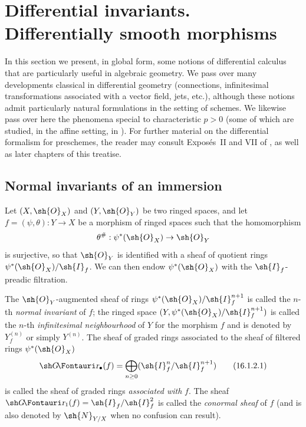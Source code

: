 \section{Differential invariants. Differentially smooth morphisms}
\label{section:IV.16}

In this section we present, in global form, some notions of differential calculus that are particularly useful in algebraic geometry.
We pass over many developments classical in differential geometry (connections, infinitesimal transformations associated with a vector field, jets, etc.), although these notions admit particularly natural formulations in the setting of schemes.
We likewise pass over here the phenomena special to characteristic $p>0$ (some of which are studied, in the affine setting, in ).
For further material on the differential formalism for preschemes, the reader may consult Expos\'es~II and VII of \cite{IV-42}, as well as later chapters of this treatise.

\subsection{Normal invariants of an immersion}
\label{IV.16.1}

\begin{env}[16.1.1]
\label{IV.16.1.1}
Let $(X, \sh{O}_X)$ and $(Y, \sh{O}_Y)$ be two ringed spaces, and let $f = (\psi, \theta): Y \to X$ be a morphism of ringed spaces  such that the homomorphism
\[
  \theta^\#: \psi^*(\sh{O}_X) \to \sh{O}_Y
\]
is surjective, so that $\sh{O}_Y$ is identified with a sheaf of quotient rings $\psi^*(\sh{O}_X)/\sh{I}_f$. 
We can then endow $\psi^*(\sh{O}_X)$ with the $\sh{I}_f$-preadic filtration.
\end{env}

\begin{definition}[16.1.2]
\label{IV.16.1.2}
The $\sh{O}_Y$-augmented sheaf of rings $\psi^*(\sh{O}_X)/\sh{I}_f^{n+1}$ is called the $n$-th \emph{normal invariant} of $f$;
the ringed space $(Y, \psi^*(\sh{O}_X)/\sh{I}_f^{n+1})$ is called the $n$-th \emph{infinitesimal neighbourhood} of $Y$ for the morphism $f$ and is denoted by $Y^{(n)}_f$ or simply $Y^{(n)}$.
The sheaf of graded rings associated to the sheaf of filtered rings $\psi^*(\sh{O}_X)$
\[
  \label{IV.16.1.2.1}
  \shGr_\bullet(f) = \bigoplus_{n \geq 0}(\sh{I}_f^{n}/\sh{I}_f^{n+1} )
  \tag{16.1.2.1}
\]
is called the sheaf of graded rings \emph{associated with} $f$. The sheaf $\shGr_1(f) = \sh{I}_f/\sh{I}_f^{2}$ is called the \emph{conormal sheaf} of $f$ (and is also denoted by $\sh{N}_{Y/X}$ when no confusion can result).
\end{definition}

